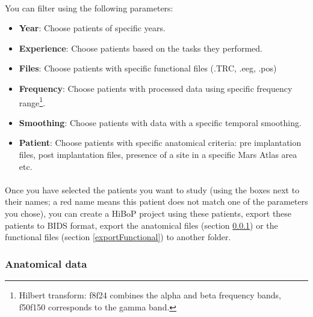 \documentclass[a4paper]{article}
\begin{document}
\paragraph{} You can filter using the following parameters:
\begin{itemize}
\item \textbf{Year}: Choose patients of specific years.
\item \textbf{Experience}: Choose patients based on the tasks they performed.
\item \textbf{Files}: Choose patients with specific functional files (.TRC, .eeg, .pos)
\item \textbf{Frequency}: Choose patients with processed data using specific frequency range\footnote{Hilbert transform: f8f24 combines the alpha and beta frequency bands, f50f150 corresponds to the gamma band.}.
\item \textbf{Smoothing}: Choose patients with data with a specific temporal smoothing.
\item \textbf{Patient}: Choose patients with specific anatomical criteria: pre implantation files, post implantation files, presence of a site in a specific Mars Atlas area etc.
\end{itemize}
\paragraph{} Once you have selected the patients you want to study (using the boxes next to their names; a red name means this patient does not match one of the parameters you chose), you can create a HiBoP project using these patients, export these patients to BIDS format, export the anatomical files (section \ref{exportAnatomical}) or the functional files (section \ref{exportFunctional}) to another folder.
\subsubsection{Anatomical data}\label{exportAnatomical}
\end{document}

